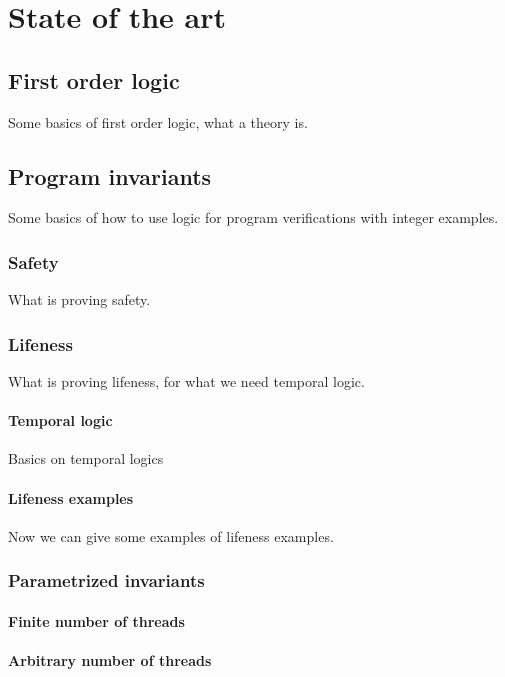 \chapter{State of the art\label{sec:estado_del_arte}}


\section{First order logic}

Some basics of first order logic, what a theory is.

\section{Program invariants}

Some basics of how to use logic for program verifications with integer examples.

\subsection{Safety}

What is proving safety.

\subsection{Lifeness}

What is proving lifeness, for what we need temporal logic.

\subsubsection{Temporal logic}

Basics on temporal logics

\subsubsection{Lifeness examples}

Now we can give some examples of lifeness examples.


\subsection{Parametrized invariants}

\subsubsection{Finite number of threads}

\subsubsection{Arbitrary number of threads}

